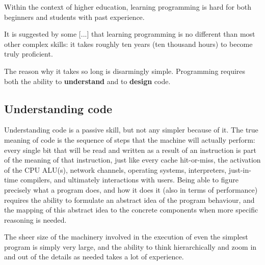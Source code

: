 Within the context of higher education, learning programming is hard for both beginners and students with past experience. 

It is suggested by some [...] that learning programming is no different than most other complex skills: it takes roughly ten years (ten thousand hours) to become truly proficient.

The reason why it takes so long is disarmingly simple. Programming requires both the ability to \textbf{understand} and to \textbf{design} code. 

\subsection{Understanding code}
Understanding code is a passive skill, but not any simpler because of it. The true meaning of code is the sequence of steps that the machine will actually perform: every single bit that will be read and written as a result of an instruction is part of the meaning of that instruction, just like every cache hit-or-miss, the activation of the CPU ALU(s), network channels, operating systems, interpreters, just-in-time compilers, and ultimately interactions with users. Being able to figure precisely what a program does, and how it does it (also in terms of performance) requires the ability to formulate an abstract idea of the program behaviour, and the mapping of this abstract idea to the concrete components when more specific reasoning is needed.

The sheer size of the machinery involved in the execution of even the simplest program is simply very large, and the ability to think hierarchically and zoom in and out of the details as needed takes a lot of experience.
